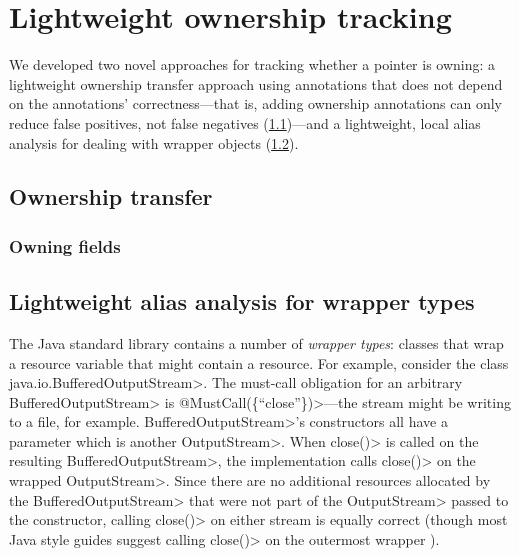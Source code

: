 \section{Lightweight ownership tracking}
\label{sec:lightweight-ownership}

We developed two novel approaches for tracking whether a pointer is
owning: a lightweight ownership transfer approach using annotations
that does not depend on the annotations' correctness---that is, adding
ownership annotations can only reduce false positives, not false
negatives (\cref{sec:ownership-transfer})---and a lightweight, local
alias analysis for dealing with wrapper objects
(\cref{sec:must-call-choice}).

\subsection{Ownership transfer}
\label{sec:ownership-transfer}


\subsubsection{Owning fields}
\label{sec:owning-fields}


\subsection{Lightweight alias analysis for wrapper types}
\label{sec:must-call-choice}

The Java standard library contains a number of \emph{wrapper types}:
classes that wrap a resource variable that might contain a resource.
For example, consider the class \<java.io.BufferedOutputStream>.  The
must-call obligation for an arbitrary \<BufferedOutputStream> is
\<@MustCall(\{``close''\})>---the stream might be writing to a file,
for example.  \<BufferedOutputStream>'s constructors all have a
parameter which is another \<OutputStream>. When \<close()> is called
on the resulting \<BufferedOutputStream>, the implementation calls
\<close()> on the wrapped \<OutputStream>. Since there are no
additional resources allocated by the \<BufferedOutputStream> that
were not part of the \<OutputStream> passed to the constructor,
calling \<close()> on either stream is equally correct (though most
Java style guides suggest calling \<close()> on the outermost
wrapper ).

